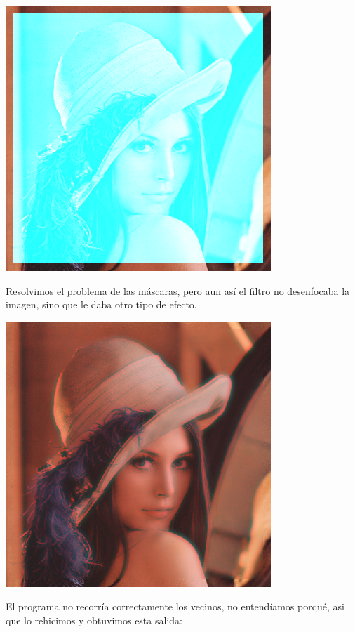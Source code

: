 \documentclass[10pt,a4paper,spanish]{article}
\begin{document}
\begin{center}\includegraphics[width=10cm, keepaspectratio]{problema_lena_cristal.png} \\\end{center}

Resolvimos el problema de las máscaras, pero aun así el filtro no desenfocaba la imagen, sino que le daba otro tipo de efecto. \\

\begin{center}\includegraphics[width=10cm, keepaspectratio]{problema_lena.png} \\\end{center}

El programa no recorría correctamente los vecinos, no entendíamos porqué, asi que lo rehicimos y obtuvimos esta salida: \\
\end{document}
